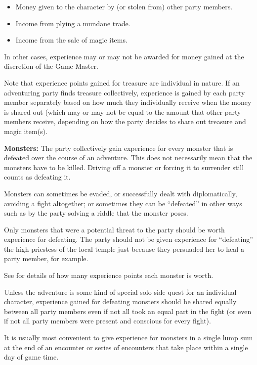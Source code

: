 \begin{multicols*}{2}
\begin{itemize}
	\item{Money given to the character by (or stolen from) other party members.}
	\item{Income from plying a mundane trade.}
	\item{Income from the sale of magic items.}
\end{itemize}

In other cases, experience may or may not be awarded for money gained at the discretion of the Game Master.

Note that experience points gained for treasure are individual in nature. If an adventuring party finds treasure collectively, experience is gained by each party member separately based on how much they individually receive when the money is shared out (which may or may not be equal to the amount that other party members receive, depending on how the party decides to share out treasure and magic item(s).

\textbf{Monsters:} The party collectively gain experience for every monster that is defeated over the course of an adventure. This does not necessarily mean that the monsters have to be killed. Driving off a monster or forcing it to surrender still counts as defeating it.

Monsters can sometimes be evaded, or successfully dealt with diplomatically, avoiding a fight altogether; or sometimes they can be “defeated” in other ways such as by the party solving a riddle that the monster poses.

Only monsters that were a potential threat to the party should be worth experience for defeating. The party should not be given experience for “defeating” the high priestess of the local temple just because they persuaded her to heal a party member, for example.

See  for details of how many experience points each monster is worth.

Unless the adventure is some kind of special solo side quest for an individual character, experience gained for defeating monsters should be shared equally between all party members even if not all took an equal part in the fight (or even if not all party members were present and conscious for every fight).

It is usually most convenient to give experience for monsters in a single lump sum at the end of an encounter or series of encounters that take place within a single day of game time.


\end{multicols*}
